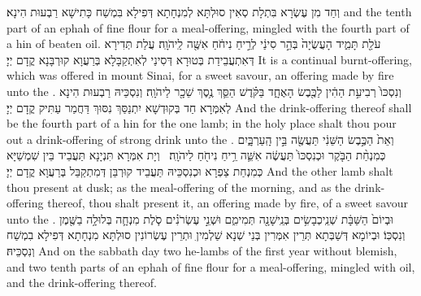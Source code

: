 {וְחַד מִן עֶשְׂרָא בִּתְלָת סְאִין סוּלְתָּא לְמִנְחָתָא דְּפִילָא בִּמְשַׁח כָּתִישָׁא רַבְעוּת הִינָא׃}
{and the tenth part of an ephah of fine flour for a meal-offering, mingled with the fourth part of a hin of beaten oil.}{}
{עֹלַ֖ת תָּמִ֑יד הָעֲשֻׂיָה֙ בְּהַ֣ר סִינַ֔י לְרֵ֣יחַ נִיחֹ֔חַ אִשֶּׁ֖ה לַֽיהֹוָֽה׃}
{עֲלַת תְּדִירָא דְּאִתְעֲבֵידַת בְּטוּרָא דְּסִינַי לְאִתְקַבָּלָא בְּרַעֲוָא קוּרְבָּנָא קֳדָם יְיָ׃}
{It is a continual burnt-offering, which was offered in mount Sinai, for a sweet savour, an offering made by fire unto the \lord.}{}
{וְנִסְכּוֹ֙ רְבִיעִ֣ת הַהִ֔ין לַכֶּ֖בֶשׂ הָאֶחָ֑ד בַּקֹּ֗דֶשׁ הַסֵּ֛ךְ נֶ֥סֶךְ שֵׁכָ֖ר לַיהֹוָֽה׃}
{וְנִסְכֵּיהּ רַבְעוּת הִינָא לְאִמְּרָא חַד בְּקוּדְשָׁא יִתְנַסַּךְ נִסּוּךְ דַּחֲמַר עַתִּיק קֳדָם יְיָ׃}
{And the drink-offering thereof shall be the fourth part of a hin for the one lamb; in the holy place shalt thou pour out a drink-offering of strong drink unto the \lord.}{}
{וְאֵת֙ הַכֶּ֣בֶשׂ הַשֵּׁנִ֔י תַּעֲשֶׂ֖ה בֵּ֣ין הָֽעַרְבָּ֑יִם כְּמִנְחַ֨ת הַבֹּ֤קֶר וּכְנִסְכּוֹ֙ תַּעֲשֶׂ֔ה אִשֵּׁ֛ה רֵ֥יחַ נִיחֹ֖חַ לַיהֹוָֽה׃ \petucha }
{וְיָת אִמְּרָא תִּנְיָנָא תַּעֲבֵיד בֵּין שִׁמְשַׁיָּא כְּמִנְחַת צַפְרָא וּכְנִסְכֵּיהּ תַּעֲבֵיד קוּרְבַּן דְּמִתְקַבַּל בְּרַעֲוָא קֳדָם יְיָ׃}
{And the other lamb shalt thou present at dusk; as the meal-offering of the morning, and as the drink-offering thereof, thou shalt present it, an offering made by fire, of a sweet savour unto the \lord.}{}
{וּבְיוֹם֙ הַשַּׁבָּ֔ת שְׁנֵֽי\maqqaf כְבָשִׂ֥ים בְּנֵֽי\maqqaf שָׁנָ֖ה תְּמִימִ֑ם וּשְׁנֵ֣י עֶשְׂרֹנִ֗ים סֹ֧לֶת מִנְחָ֛ה בְּלוּלָ֥ה בַשֶּׁ֖מֶן וְנִסְכּֽוֹ׃}
{וּבְיוֹמָא דְּשַׁבְּתָא תְּרֵין אִמְּרִין בְּנֵי שְׁנָא שַׁלְמִיןִ וּתְרֵין עֶשְׂרוֹנִין סוּלְתָּא מִנְחָתָא דְּפִילָא בִמְשַׁח וְנִסְכֵּיהּ׃}
{And on the sabbath day two he-lambs of the first year without blemish, and two tenth parts of an ephah of fine flour for a meal-offering, mingled with oil, and the drink-offering thereof.}{}
